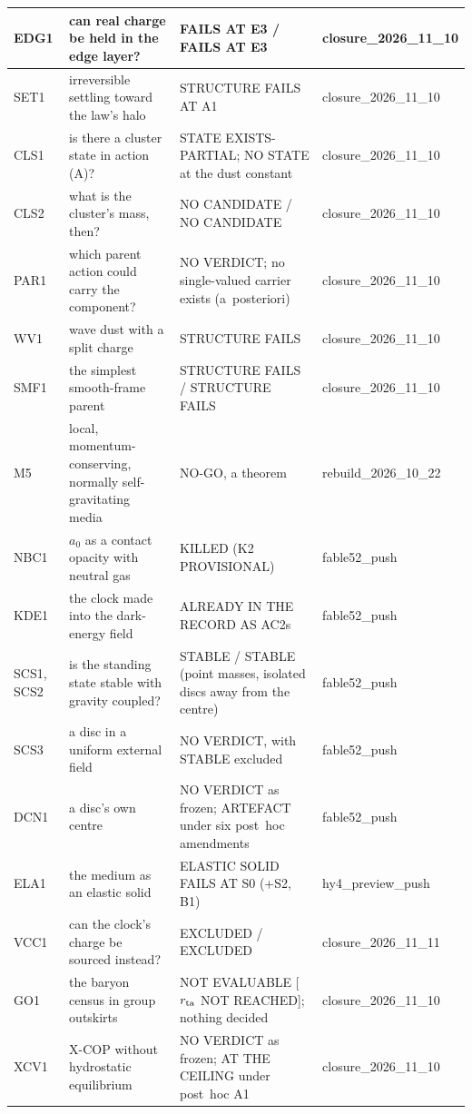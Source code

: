 \documentclass[10pt]{article}
\begin{document}
\begin{center}
\begin{longtable}{@{}p{1.3cm}p{5.0cm}p{5.4cm}p{2.4cm}@{}}
EDG1 & can real charge be held in the edge layer? & FAILS AT E3 / FAILS AT E3 & closure\_2026\_11\_10\\\midrule
SET1 & irreversible settling toward the law's halo & STRUCTURE FAILS AT A1 & closure\_2026\_11\_10\\\midrule
CLS1 & is there a cluster state in action (A)? & STATE EXISTS-PARTIAL; NO STATE at the dust constant & closure\_2026\_11\_10\\\midrule
CLS2 & what is the cluster's mass, then? & NO CANDIDATE / NO CANDIDATE & closure\_2026\_11\_10\\\midrule
PAR1 & which parent action could carry the component? & NO VERDICT; no single-valued carrier exists (a~posteriori) & closure\_2026\_11\_10\\\midrule
WV1 & wave dust with a split charge & STRUCTURE FAILS & closure\_2026\_11\_10\\\midrule
SMF1 & the simplest smooth-frame parent & STRUCTURE FAILS / STRUCTURE FAILS & closure\_2026\_11\_10\\\midrule
M5 & local, momentum-conserving, normally self-gravitating media & NO-GO, a theorem & rebuild\_2026\_10\_22\\\midrule
NBC1 & $a_0$ as a contact opacity with neutral gas & KILLED (K2 PROVISIONAL) & fable52\_push\\\midrule
KDE1 & the clock made into the dark-energy field & ALREADY IN THE RECORD AS AC2s & fable52\_push\\\midrule
SCS1, SCS2 & is the standing state stable with gravity coupled? & STABLE / STABLE (point masses, isolated discs away from the centre) & fable52\_push\\\midrule
SCS3 & a disc in a uniform external field & NO VERDICT, with STABLE excluded & fable52\_push\\\midrule
DCN1 & a disc's own centre & NO VERDICT as frozen; ARTEFACT under six post~hoc amendments & fable52\_push\\\midrule
ELA1 & the medium as an elastic solid & ELASTIC SOLID FAILS AT S0 (+S2, B1) & hy4\_preview\_push\\\midrule
VCC1 & can the clock's charge be sourced instead? & EXCLUDED / EXCLUDED & closure\_2026\_11\_11\\\midrule
GO1 & the baryon census in group outskirts & NOT EVALUABLE [$r_{\rm ta}$ NOT REACHED]; nothing decided & closure\_2026\_11\_10\\\midrule
XCV1 & X-COP without hydrostatic equilibrium & NO VERDICT as frozen; AT THE CEILING under post~hoc A1 & closure\_2026\_11\_10\\\midrule

\end{longtable}
\end{center}
\end{document}
